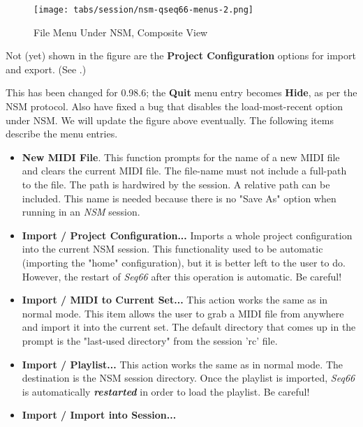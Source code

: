 \begin{figure}[H]
   \centering 
   \texttt{[image: tabs/session/nsm-qseq66-menus-2.png]}
   \caption*{File Menu Under NSM, Composite View}
\end{figure}

   Not (yet) shown in the figure are the \textbf{Project Configuration}
   options for import and export.
   (See .)

   This has been changed for 0.98.6; the \textbf{Quit} menu entry becomes
   \textbf{Hide}, as per the NSM protocol.  Also have fixed a bug that disables
   the load-most-recent option under NSM.
   We will update the figure above eventually.
   The following items describe the menu entries.

   \begin{itemize}
      \item \textbf{New MIDI File}.
         This function prompts for the name of a
         new MIDI file and clears the current MIDI file.  The file-name must not
         include a full-path to the file.  The path is hardwired by the
         session.  A relative path can be included.  This name is needed
         because there is no "Save As" option when running in an \textsl{NSM}
         session.
      \item \textbf{Import / Project Configuration...}
         Imports a whole project configuration into the current NSM session.
         This functionality used to be automatic (importing the "home"
         configuration), but it is better left to the user to do.
         However, the restart of \textsl{Seq66} after this operation is
         automatic.  Be careful!
      \item \textbf{Import / MIDI to Current Set...}
         This action works the same as in normal mode.
         This item allows the user to grab a MIDI file from anywhere and import
         it into the current set.
         The default directory that comes up in the
         prompt is the "last-used directory" from the session 'rc' file.
      \item \textbf{Import / Playlist...}
         This action works the same as in normal mode.
         The destination is the NSM session directory.
         Once the playlist is imported,
         \textsl{Seq66} is automatically \textsl{\textbf{restarted}}
         in order to load the playlist.
         Be careful!
      \item \textbf{Import / Import into Session...}

\end{itemize}
